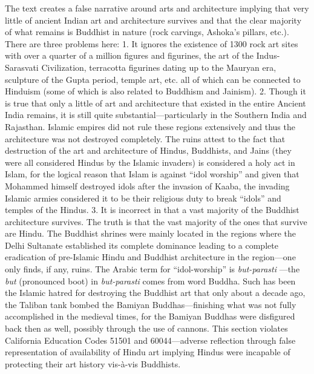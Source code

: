 The text creates a false narrative around arts and architecture implying that very little of ancient Indian art and architecture survives and that the clear majority of what remains is Buddhist in nature (rock carvings, Ashoka’s pillars, etc.). There are three problems here: 1. It ignores the existence of 1300 rock art sites with over a quarter of a million figures and figurines, the art of the Indus-Sarasvati Civilization, terracotta figurines dating up to the Mauryan era, sculpture of the Gupta period, temple art, etc. all of which can be connected to Hinduism (some of which is also related to Buddhism and Jainism). 2. Though it is true that only a little of art and architecture that existed in the entire Ancient India remains, it is still quite substantial—particularly in the Southern India and Rajasthan. Islamic empires did not rule these regions extensively and thus the architecture was not destroyed completely. The ruins attest to the fact that destruction of the art and architecture of Hindus, Buddhists, and Jains (they were all considered Hindus by the Islamic invaders) is considered a holy act in Islam, for the logical reason that Islam is against “idol worship” and given that Mohammed himself destroyed idols after the invasion of Kaaba, the invading Islamic armies considered it to be their religious duty to break “idols” and temples of the Hindus. 3. It is incorrect in that a vast majority of the Buddhist architecture survives. The truth is that the vast majority of the ones that survive are Hindu. The Buddhist shrines were mainly located in the regions where the Delhi Sultanate established its complete dominance leading to a complete eradication of pre-Islamic Hindu and Buddhist architecture in the region—one only finds, if any, ruins. The Arabic term for “idol-worship” is \textit{but-parasti} —the \textit{but}  (pronounced boot) in \textit{but-parasti}  comes from word Buddha. Such has been the Islamic hatred for destroying the Buddhist art that only about a decade ago, the Taliban tank bombed the Bamiyan Buddhas—finishing what was not fully accomplished in the medieval times, for the Bamiyan Buddhas were disfigured back then as well, possibly through the use of cannons. This section violates California Education Codes 51501 and 60044—adverse reflection through false representation of availability of Hindu art implying Hindus were incapable of protecting their art history vis-à-vis Buddhists.

